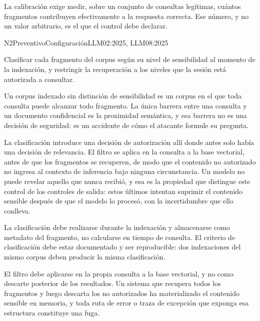 La calibración exige medir, sobre un conjunto de consultas legítimas, cuántos fragmentos contribuyen efectivamente a la respuesta correcta. Ese número, y no un valor arbitrario, es el que el control debe declarar.


  {N2}{Preventivo}{Configuración}{LLM02:2025, LLM08:2025}

Clasificar cada fragmento del corpus según su nivel de sensibilidad al momento de la indexación, y restringir la recuperación a los niveles que la sesión está autorizada a consultar.

Un corpus indexado sin distinción de sensibilidad es un corpus en el que toda consulta puede alcanzar todo fragmento. La única barrera entre una consulta y un documento confidencial es la proximidad semántica, y esa barrera no es una decisión de seguridad: es un accidente de cómo el atacante formule su pregunta.

La clasificación introduce una decisión de autorización allí donde antes solo había una decisión de relevancia. El filtro se aplica en la consulta a la base vectorial, antes de que los fragmentos se recuperen, de modo que el contenido no autorizado no ingresa al contexto de inferencia bajo ninguna circunstancia. Un modelo no puede revelar aquello que nunca recibió, y esa es la propiedad que distingue este control de los controles de salida: estos últimos intentan suprimir el contenido sensible después de que el modelo lo procesó, con la incertidumbre que ello conlleva.

La clasificación debe realizarse durante la indexación y almacenarse como metadato del fragmento, no calcularse en tiempo de consulta. El criterio de clasificación debe estar documentado y ser reproducible: dos indexaciones del mismo corpus deben producir la misma clasificación.

El filtro debe aplicarse en la propia consulta a la base vectorial, y no como descarte posterior de los resultados. Un sistema que recupera todos los fragmentos y luego descarta los no autorizados ha materializado el contenido sensible en memoria, y toda ruta de error o traza de excepción que exponga esa estructura constituye una fuga.

